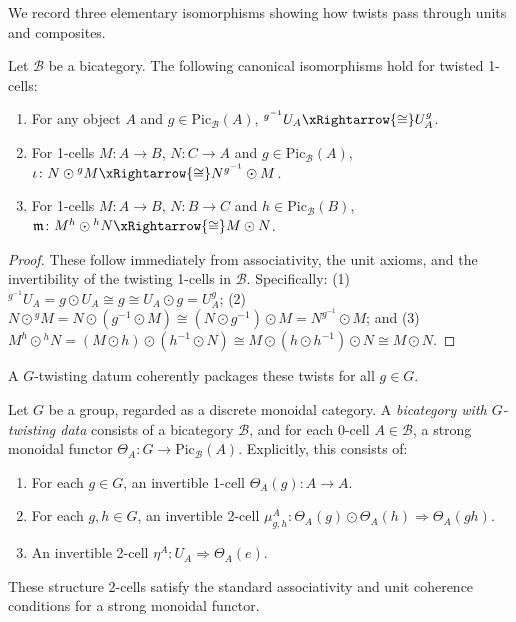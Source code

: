 \documentclass[11pt,oneside]{amsart}
\numberwithin{equation}{section}
\numberwithin{figure}{section}
\theoremstyle{plain}
\theoremstyle{definition}
\theoremstyle{remark}
\begin{document}
 

We record three elementary isomorphisms showing how twists pass through units and composites.

\begin{lemma}\label{lem:twist_properties}
\label{lem:twist_unit}
\label{lem:twist_swap}
\label{lem:twist_cancel}
Let $\mathcal{B}$ be a bicategory. The following canonical isomorphisms hold for twisted 1-cells:
\begin{enumerate}
    \item For any object $A$ and $g\in \mathrm{Pic}_{\mathcal B}(A)$, ${}^{g^{-1}}U_A \xRightarrow{\cong} U_A^g$.
    \item For 1-cells $M\colon A\to B$, $N\colon C\to A$ and $g\in \mathrm{Pic}_{\mathcal B}(A)$, $\iota\colon N\odot {}^gM \xRightarrow{\cong} N^{g^{-1}}\odot M$.
    \item For 1-cells $M\colon A\to B$, $N\colon B\to C$ and $h\in \mathrm{Pic}_{\mathcal B}(B)$, $\mathfrak{m}\colon M^h\odot {}^hN \xRightarrow{\cong} M\odot N$.
\end{enumerate}
\end{lemma}
\begin{proof}
These follow immediately from associativity, the unit axioms, and the invertibility of the twisting 1-cells in $\mathcal{B}$. Specifically: (1) ${}^{g^{-1}}U_A = g\odot U_A \cong g \cong U_A\odot g = U_A^g$; (2) $N\odot {}^gM = N\odot (g^{-1}\odot M) \cong (N\odot g^{-1})\odot M = N^{g^{-1}}\odot M$; and (3) $M^h\odot {}^hN = (M\odot h)\odot (h^{-1}\odot N) \cong M\odot (h\odot h^{-1})\odot N \cong M\odot N$.
\end{proof}

 


A $G$-twisting datum coherently packages these twists for all $g\in G.$

\begin{definition}\label{def:G_twisting_data}
Let $G$ be a group, regarded as a discrete monoidal category. A \emph{bicategory with $G$-twisting data} consists of a bicategory $\mathcal{B}$, and for each 0-cell $A \in \mathcal{B}$, a strong monoidal functor $\Theta_A \colon G \to \mathrm{Pic}_{\mathcal{B}}(A)$. Explicitly, this consists of:
\begin{enumerate}
\item For each $g \in G$, an invertible 1-cell $\Theta_A(g) \colon A \to A$.
\item For each $g, h \in G$, an invertible 2-cell $\mu^A_{g,h} \colon \Theta_A(g) \odot \Theta_A(h) \Rightarrow \Theta_A(gh)$.
\item An invertible 2-cell $\eta^A \colon U_A \Rightarrow \Theta_A(e)$.
\end{enumerate}
These structure 2-cells satisfy the standard associativity and unit
coherence conditions for a strong monoidal functor.
\end{definition}
\end{document}
